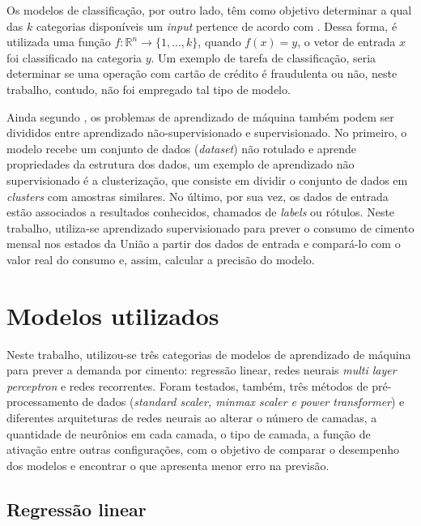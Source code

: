 Os modelos de classificação, por outro lado, têm como objetivo 
determinar a qual das $k$ categorias disponíveis um 
\textit{input} pertence de acordo com \cite{dl-oreilly}. Dessa forma, é utilizada uma função  
$ f : \mathbb{R}^n \rightarrow \{1,...,k\}$, quando 
$ f(x) = y$, o vetor de entrada $x$ foi classificado 
na categoria $y$. Um exemplo de tarefa de classificação,
seria determinar se uma operação com cartão de crédito 
é fraudulenta ou não, neste trabalho, contudo, não foi empregado 
tal tipo de modelo. 

Ainda segundo \cite{Goodfellow-et-al-2016}, os problemas de 
aprendizado de máquina também podem ser divididos entre
aprendizado não-supervisionado e supervisionado. No primeiro, 
o modelo recebe um conjunto de dados (\textit{dataset}) não 
rotulado e aprende propriedades da estrutura dos dados, 
um exemplo de aprendizado não supervisionado é a clusterização,
que consiste em dividir o conjunto de dados
em \textit{clusters} com amostras similares. No último, por sua vez, 
os dados de entrada estão associados a resultados conhecidos, 
chamados de \textit{labels} ou rótulos. Neste trabalho, utiliza-se aprendizado 
supervisionado para prever o consumo de cimento mensal nos 
estados da União a partir dos dados de entrada e compará-lo 
com o valor real 
do consumo e, assim, calcular a precisão do modelo.

\section{Modelos utilizados}

Neste trabalho, utilizou-se três categorias de modelos de aprendizado 
de máquina para prever a demanda por cimento: regressão linear, redes
neurais \textit{multi layer perceptron} e redes recorrentes. Foram testados, também,
três métodos de pré-processamento de dados (\textit{standard scaler, minmax 
scaler e power transformer}) e  diferentes arquiteturas de 
redes neurais ao alterar o número de camadas, a quantidade de neurônios
em cada camada, o tipo de camada, a função de ativação entre outras
configurações, com o objetivo de comparar 
o desempenho dos modelos e encontrar o que apresenta menor erro na previsão.

\subsection{Regressão linear}
\label{sec:reg_lin}

